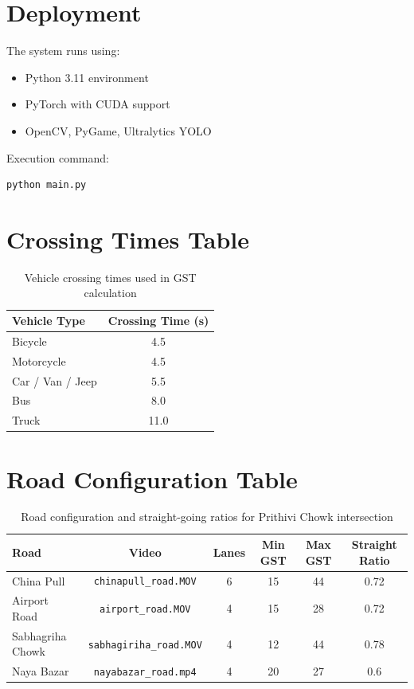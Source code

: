 \section{Deployment}

The system runs using:
\begin{itemize}
    \item Python 3.11 environment
    \item PyTorch with CUDA support
    \item OpenCV, PyGame, Ultralytics YOLO
\end{itemize}

Execution command:
\begin{verbatim}
python main.py
\end{verbatim}

\section*{Crossing Times Table}

\begin{table}[H]
\centering
\begin{tabular}{|l|c|}
\hline
\textbf{Vehicle Type} & \textbf{Crossing Time (s)} \\
\hline
Bicycle & 4.5 \\
Motorcycle & 4.5 \\
Car / Van / Jeep & 5.5 \\
Bus & 8.0 \\
Truck & 11.0 \\
\hline
\end{tabular}
\caption{Vehicle crossing times used in GST calculation}
\end{table}

\section*{Road Configuration Table}

\begin{table}[H]
\centering
\begin{tabular}{|l|c|c|c|c|c|}
\hline
\textbf{Road} & \textbf{Video} & \textbf{Lanes} & \textbf{Min GST} & \textbf{Max GST} & \textbf{Straight Ratio} \\
\hline
China Pull & \texttt{chinapull\_road.MOV} & 6 & 15 & 44 & 0.72 \\
Airport Road & \texttt{airport\_road.MOV} & 4 & 15 & 28 & 0.72 \\
Sabhagriha Chowk & \texttt{sabhagiriha\_road.MOV} & 4 & 12 & 44 & 0.78 \\
Naya Bazar & \texttt{nayabazar\_road.mp4} & 4 & 20 & 27 & 0.6 \\
\hline
\end{tabular}
\caption{Road configuration and straight-going ratios for Prithivi Chowk intersection}
\end{table}